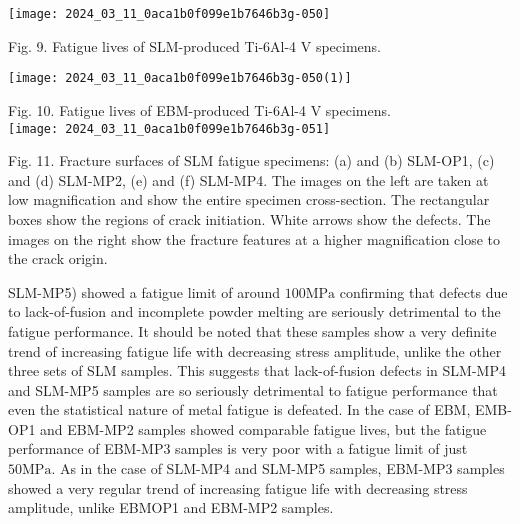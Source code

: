 \documentclass[10pt]{article}
\begin{document}
\begin{center}
\texttt{[image: 2024\_03\_11\_0aca1b0f099e1b7646b3g-050]}
\end{center}

Fig. 9. Fatigue lives of SLM-produced Ti-6Al-4 V specimens.

\begin{center}
\texttt{[image: 2024\_03\_11\_0aca1b0f099e1b7646b3g-050(1)]}
\end{center}

Fig. 10. Fatigue lives of EBM-produced Ti-6Al-4 V specimens.\\
\texttt{[image: 2024\_03\_11\_0aca1b0f099e1b7646b3g-051]}

Fig. 11. Fracture surfaces of SLM fatigue specimens: (a) and (b) SLM-OP1, (c) and (d) SLM-MP2, (e) and (f) SLM-MP4. The images on the left are taken at low magnification and show the entire specimen cross-section. The rectangular boxes show the regions of crack initiation. White arrows show the defects. The images on the right show the fracture features at a higher magnification close to the crack origin.

SLM-MP5) showed a fatigue limit of around $100 \mathrm{MPa}$ confirming that defects due to lack-of-fusion and incomplete powder melting are seriously detrimental to the fatigue performance. It should be noted that these samples show a very definite trend of increasing fatigue life with decreasing stress amplitude, unlike the other three sets of SLM samples. This suggests that lack-of-fusion defects in SLM-MP4 and SLM-MP5 samples are so seriously detrimental to fatigue performance that even the statistical nature of metal fatigue is defeated. In the case of EBM, EMB-OP1 and EBM-MP2 samples showed comparable fatigue lives, but the fatigue performance of EBM-MP3 samples is very poor with a fatigue limit of just $50 \mathrm{MPa}$. As in the case of SLM-MP4 and SLM-MP5 samples, EBM-MP3 samples showed a very regular trend of increasing fatigue life with decreasing stress amplitude, unlike EBMOP1 and EBM-MP2 samples.
\end{document}

